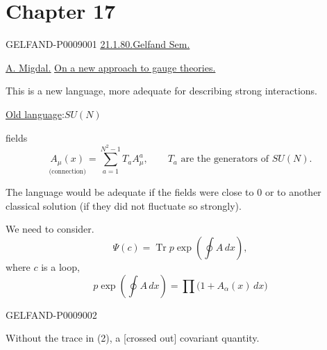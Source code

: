 \section*{Chapter 17}
\begin{GelfandAdjacentEvidence}{GELFAND-P000900}{1}
\underline{\underline{21.1.80.}}\qquad\uline{Gelfand Sem.}

\underline{\underline{A. Migdal.}}\qquad
\uline{On a new approach to gauge theories.}

This is a new language, more adequate for describing strong interactions.

\uline{Old language}:\quad $SU(N)$

fields
\begin{equation*}
\underset{\text{(connection)}}{A_\mu(x)}
=\sum_{a=1}^{N^2-1} T_a A_\mu^a,\qquad
T_a\text{ are the generators of }SU(N). \tag{1}
\end{equation*}

The language would be adequate if the fields were close to $0$ or to another classical solution (if they did not fluctuate so strongly).

We need to consider.
\begin{equation*}
\Psi(c)=\operatorname{Tr}p\exp\left(\oint A\,dx\right), \tag{2}
\end{equation*}
where $c$ is a loop,
\begin{equation*}
p\exp\left(\oint A\,dx\right)=\prod\bigl(1+A_\alpha(x)\,dx\bigr) \tag{3}
\end{equation*}
\end{GelfandAdjacentEvidence}
\begin{GelfandAdjacentEvidence}{GELFAND-P000900}{2}


Without the trace in (2), a [crossed out] covariant quantity.
\end{GelfandAdjacentEvidence}
